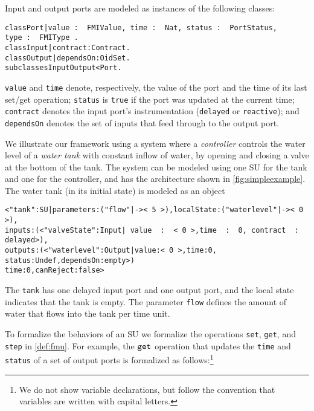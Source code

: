 Input and output ports are modeled as  instances of the following
classes:

\small
\begin{alltt}
class Port | value\,:\,\,FMIValue,\,time\,:\,\,Nat,\,status\,:\,\,PortStatus,\,type\,:\,\,FMIType\,. 
class Input | contract : Contract .
class Output | dependsOn : OidSet .     
subclasses Input Output < Port .
\end{alltt}
\normalsize

\noindent %
\texttt{value} and \texttt{time} denote, respectively, the
value of the port and the time of its last set/get operation; 
\texttt{status} is \texttt{true}  if the port was
updated  at the current time;   \texttt{contract} denotes the
input port's instrumentation (\texttt{delayed} or
\texttt{reactive}); and 
\texttt{dependsOn} denotes the set of inputs that feed
through to the output port. 

\begin{example}
  We illustrate our  framework using a system where a
\emph{controller} 
controls the water level of a \emph{water tank} with constant inflow
of water,  by opening and closing a valve
at the bottom of the tank. 
The system can be modeled using  one SU for the tank and one for
the controller, and has the architecture shown in
\cref{fig:simpleexample}.
%
The water tank  (in its initial state)  is modeled as an object
  
\scriptsize
\begin{alltt}
< "tank" : SU | parameters : ("flow" |-> <\,5\,>),  localState : ("waterlevel" |-> <\,0\,>),
                inputs : (< "valveState" : Input |\,value\,\,:\,\,<\,0\,>, time\,\,:\,\,0,\,contract\,\,:\,\,delayed >),
                outputs : (< "waterlevel" : Output | value : <\,0\,>, time : 0,
                                                     status : Undef, dependsOn : empty >)
                time : 0,  canReject : false >
\end{alltt}
\normalsize

\noindent The \texttt{tank} has one delayed input port and one output
port, and the local state indicates that the tank is empty.  
The parameter \texttt{flow} defines the amount of water that flows
into the tank per time unit.
\end{example}

To formalize the behaviors of an SU we formalize the operations
\texttt{set}, \texttt{get}, and \texttt{step} in
\cref{def:fmu}. 
For example, the $\mathtt{get}_{}$ operation that updates the \texttt{time}
and \texttt{status}  of a set
of output ports is formalized as follows:\footnote{We do not show
  variable declarations, but follow the convention that variables are
  written with capital letters.} 


